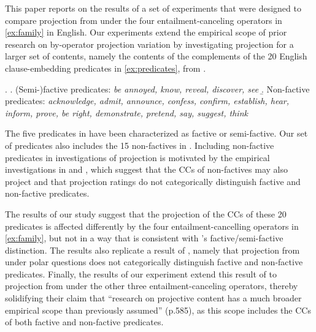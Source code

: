 \documentclass[a4paper,12pt,twoside]{article}
\newcommand{\poscite}[1]{\citeauthor{#1}'s \citeyear{#1}}
\begin{document}
    This paper reports on the results of a set of experiments that were designed to compare projection from under the four entailment-canceling operators in \ref{ex:family} in English. Our experiments extend the empirical scope of prior research on by-operator projection variation by investigating projection for a larger set of contents, namely the contents of the complements of the 20 English clause-embedding predicates in \ref{ex:predicates}, from \citet{degen_are_2022}.
    
    \ex. \label{ex:predicates}
    		\a. (Semi-)factive predicates: {\em be annoyed, know, reveal, discover, see}
      \b. Non-factive predicates: {\em acknowledge, admit, announce, confess, confirm, establish, hear, inform, prove, be right, demonstrate, pretend, say, suggest, think}
    
    The five predicates in \Last[a] have been characterized as factive or semi-factive. Our set of predicates also includes the 15 non-factives in \Last[b]. Including non-factive predicates in investigations of projection is motivated by the empirical investigations in \citealt{de_marneffe_commitmentbank_2019} and \citealt{degen_are_2022}, which suggest that the CCs of non-factives may also project and that projection ratings do not categorically distinguish factive and non-factive predicates.
  
    The results of our study suggest that the projection of the CCs of these 20 predicates is affected differently by the four entailment-cancelling operators in \ref{ex:family},  but not in a way that is consistent with \poscite{karttunen_observations_1971} factive/semi-factive distinction. The results also replicate a result of \citealt{degen_are_2022}, namely that projection from under polar questions does not categorically distinguish factive and non-factive predicates. Finally, the results of our experiment extend this result of \citealt{degen_are_2022} to projection from under the other three entailment-canceling operators, thereby solidifying their claim that ``research on projective content has a much broader empirical scope than previously assumed'' (p.585), as this scope includes the CCs of both factive and non-factive predicates.
    

\end{document}
